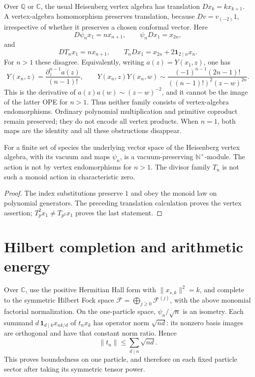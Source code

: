 \begin{proposition}
\label{v4-arith:prop:T-n-not-VA-endo}
Over \(\mathbb Q\) or \(\mathbb C\), the usual Heisenberg vertex algebra
has translation \(D x_k=kx_{k+1}\). A vertex-algebra homomorphism preserves
translation, because \(Dv=v_{(-2)}1\), irrespective of whether it
preserves a chosen conformal vector. Here
\[
 D\psi_nx_1=nx_{n+1},\qquad \psi_nDx_1=x_{2n},
\]
and
\[
 DT_nx_1=nx_{n+1},\qquad
 T_nDx_1=x_{2n}+2\mathbf1_{2\mid n}x_n.
\]
For \(n>1\) these disagree. Equivalently, writing
\(a(z)=Y(x_1,z)\), one has
\[
 Y(x_n,z)=\frac{\partial_z^{n-1}a(z)}{(n-1)!},\qquad
 Y(x_n,z)Y(x_n,w)\sim
 \frac{(-1)^{n-1}(2n-1)!}{((n-1)!)^2(z-w)^{2n}}.
\]
This is the derivative of \(a(z)a(w)\sim(z-w)^{-2}\), and it cannot
be the image of the latter OPE for \(n>1\). Thus neither family consists
of vertex-algebra endomorphisms. Ordinary polynomial multiplication and
primitive coproduct remain preserved; they do not encode all vertex
products. When \(n=1\), both maps are the identity and all these
obstructions disappear.
\end{proposition}

\begin{proposition}
\label{v4-arith:thm:HVA-category}
For a finite set of species the underlying vector space of the
Heisenberg vertex algebra, with its vacuum and maps \(\psi_n\), is a
vacuum-preserving \(\mathbb N^\times\)-module. The action is not by
vertex endomorphisms for \(n>1\). The divisor family \(T_n\) is not
such a monoid action in characteristic zero.
\end{proposition}
\begin{proof}
The index substitutions preserve \(1\) and obey the monoid law on
polynomial generators. The preceding translation calculation proves the
vertex assertion; \(T_p^2x_1\ne T_{p^2}x_1\) proves the last statement.
\end{proof}


\section{Hilbert completion and arithmetic energy}
\label{v4-arith:ado:hilbert}
\label{v4-arith:gb:log-p-destroys-integrality}

Over \(\mathbb C\), use the positive Hermitian Hall form with
\(\|x_{s,k}\|^2=k\), and complete to the symmetric Hilbert Fock space
\(\mathcal F=\bigoplus_{j\ge0}\mathcal F^{(j)}\), with the above
monomial factorial normalization. On the one-particle space,
\(\psi_n/\sqrt n\) is an isometry. Each summand
\(d\,\mathbf1_{d\mid k}x_{nk/d}\) of \(t_nx_k\) has operator norm
\(\sqrt{nd}\): its nonzero basis images are orthogonal and have that
constant norm ratio. Hence
\[
 \|t_n\|\le\sum_{d\mid n}\sqrt{nd}.
\]
This proves boundedness on one particle, and therefore on each fixed
particle sector after taking its symmetric tensor power.

